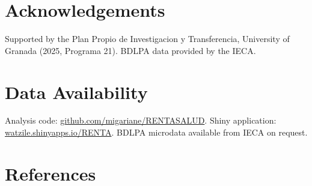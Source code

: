 \documentclass[
  11pt,
  a4paper,
]{article}
\begin{document}
\section{Acknowledgements}\label{acknowledgements}

Supported by the Plan Propio de Investigacion y Transferencia,
University of Granada (2025, Programa 21). BDLPA data provided by the
IECA.

\section{Data Availability}\label{data-availability}

Analysis code:
\href{https://github.com/migariane/RENTASALUD}{github.com/migariane/RENTASALUD}.
Shiny application:
\href{https://watzile.shinyapps.io/RENTA/}{watzile.shinyapps.io/RENTA}.
BDLPA microdata available from IECA on request.

\section{References}\label{references}
\end{document}
